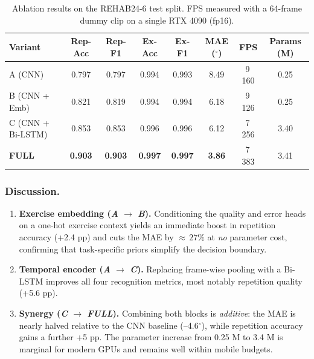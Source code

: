 \documentclass{article}
\begin{document}
\begin{enumerate}[label=\textbf{\Alph*.}, leftmargin=2em, itemsep=6pt]
\begin{table}[H] 
  \caption{Ablation results on the REHAB24-6 test split.
           FPS measured with a 64-frame dummy clip on a single RTX 4090 (fp16).}
  \label{tab:ablate}
  \centering
  \small               %
  \setlength{\tabcolsep}{3pt}   %
  \begin{tabularx}{\columnwidth}{@{}lCCCCCCC@{}}
    \toprule
    \textbf{Variant} &
    \textbf{Rep-Acc} & \textbf{Rep-F1} &
    \textbf{Ex-Acc}  & \textbf{Ex-F1} &
    \textbf{MAE ($^{\circ}$)} & \textbf{FPS} & \textbf{Params (M)} \\ \midrule
    A (CNN)                 & 0.797 & 0.797 & 0.994 & 0.993 & 8.49 & 9\,160 & 0.25 \\
    B (CNN + Emb)           & 0.821 & 0.819 & 0.994 & 0.994 & 6.18 & 9\,126 & 0.25 \\
    C (CNN + Bi-LSTM)       & 0.853 & 0.853 & 0.996 & 0.996 & 6.12 & 7\,256 & 3.40 \\
    \textbf{FULL}           & \textbf{0.903} & \textbf{0.903} &
                              \textbf{0.997} & \textbf{0.997} &
                              \textbf{3.86} & 7\,383 & 3.41 \\
    \bottomrule
  \end{tabularx}
\end{table}

\subsubsection{Discussion.}
\begin{enumerate}[leftmargin=1.35em,itemsep=2pt]
  \item \textbf{Exercise embedding (\textit{A} $\rightarrow$ \textit{B}).}
        Conditioning the quality and error heads on a one-hot exercise
        context yields an immediate boost in repetition accuracy
        (+2.4 pp) and cuts the MAE by \(\approx\,27\%\) at \emph{no}
        parameter cost, confirming that task-specific priors simplify
        the decision boundary.
  \item \textbf{Temporal encoder (\textit{A} $\rightarrow$ \textit{C}).}
        Replacing frame-wise pooling with a Bi-LSTM improves all four
        recognition metrics, most notably repetition quality
        (+5.6 pp).
  \item \textbf{Synergy (\textit{C} $\rightarrow$ \textit{FULL}).}
        Combining both blocks is \emph{additive}: the MAE is nearly
        halved relative to the CNN baseline (–4.6$^{\circ}$), while
        repetition accuracy gains a further +5 pp.  The parameter
        increase from 0.25 M to 3.4 M is marginal for modern GPUs and
        remains well within mobile budgets.
\end{enumerate}


\end{enumerate}
\end{document}
